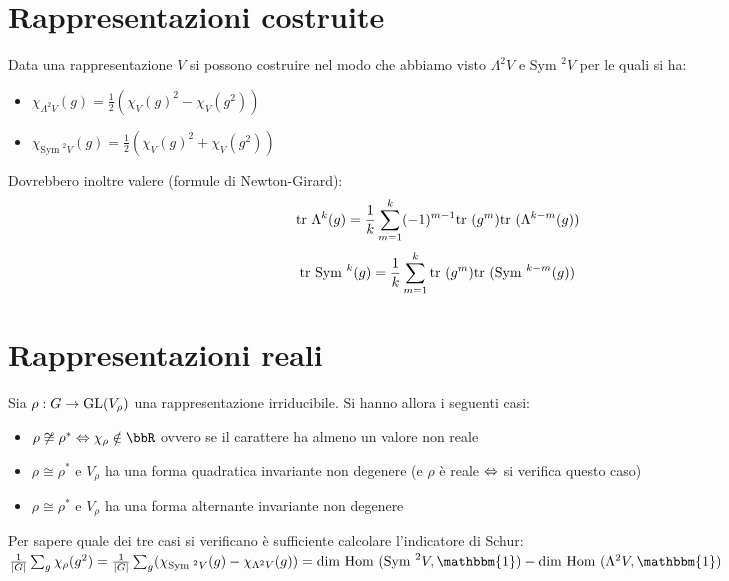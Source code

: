 \documentclass[a4paper,NoNotes,GeneralMath]{stdmdoc}
\newcommand{\Sym}{\text{Sym }}
\newcommand{\Hom}{\text{Hom }}
\begin{document}
	\section{Rappresentazioni costruite}
	Data una rappresentazione $V$ si possono costruire nel modo che abbiamo visto $\Lambda^2 V$ e $\Sym^2 V$ per le quali si ha:
	\begin{itemize}
		\item $\chi_{\Lambda^2 V}(g) = \frac{1}{2} (\chi_V(g)^2 - \chi_V(g^2))$
		\item $\chi_{\Sym^2 V}(g) = \frac{1}{2} (\chi_V(g)^2 + \chi_V(g^2))$
	\end{itemize}
	Dovrebbero inoltre valere (formule di Newton-Girard): 
	$$ \mbox{tr } \Lambda^k(g) = \frac{1}{k} \sum_{m=1}^k (-1)^{m-1} \mbox{tr }(g^m) \mbox{tr }(\Lambda^{k-m}(g)) $$
	$$ \Tr \Sym^k(g) = \frac{1}{k} \sum_{m=1}^k \Tr(g^m) \Tr(\Sym^{k-m}(g)) $$

	\section{Rappresentazioni reali}
	Sia $\rho: G \rightarrow \mbox{GL}(V_\rho)$ una rappresentazione irriducibile. Si hanno allora i seguenti casi:
	\begin{itemize}
		\item $\rho \not\cong \rho^{*} \sse \chi_\rho \notin \bbR$ ovvero se il carattere ha almeno un valore non reale
		\item $\rho \cong \rho^{*}$ e $V_\rho$ ha una forma quadratica invariante non degenere (e $\rho$ è reale $\Leftrightarrow$ si verifica questo caso)
		\item $\rho \cong \rho^{*}$ e $V_\rho$ ha una forma alternante invariante non degenere
	\end{itemize}
	Per sapere quale dei tre casi si verificano è sufficiente calcolare l'indicatore di Schur:
	$\frac{1}{\mid G \mid} \sum_g \chi_\rho(g^2) = \frac{1}{\mid G \mid} \sum_g (\chi_{\Sym^2 V}(g) - \chi_{\Lambda^2 V}(g)) = \Dim \Hom (\Sym^2 V, \mathbbm{1}) - \Dim \Hom (\Lambda^2 V, \mathbbm{1}) $
\end{document}
